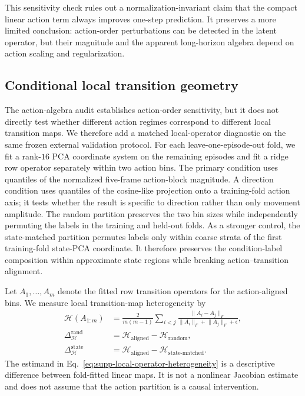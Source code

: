 \documentclass{article}
\begin{document}
This sensitivity check rules out a normalization-invariant claim that the
compact linear action term always improves one-step prediction. It preserves a
more limited conclusion: action-order perturbations can be detected in the
latent operator, but their magnitude and the apparent long-horizon algebra
depend on action scaling and regularization.

\subsection{Conditional local transition geometry}
\label{sec:supp-conditional-operator-geometry}

The action-algebra audit establishes action-order sensitivity, but it does not
directly test whether different action regimes correspond to different local
transition maps. We therefore add a matched local-operator diagnostic on the
same frozen external validation protocol. For each leave-one-episode-out fold,
we fit a rank-$16$ PCA coordinate system on the remaining episodes and fit a
ridge row operator separately within two action bins. The primary condition
uses quantiles of the normalized five-frame action-block magnitude. A
direction condition uses quantiles of the cosine-like projection onto a
training-fold action axis; it tests whether the result is specific to direction
rather than only movement amplitude. The random partition preserves the two
bin sizes while independently permuting the labels in the training and held-out
folds. As a stronger control, the state-matched partition permutes labels only
within coarse strata of the first training-fold state-PCA coordinate. It
therefore preserves the condition-label composition within approximate state
regions while breaking action--transition alignment.

Let $A_1,\ldots,A_m$ denote the fitted row transition operators for the
action-aligned bins. We measure local transition-map heterogeneity by
\begin{equation}
\begin{aligned}
\mathcal{H}(A_{1:m})
&=\frac{2}{m(m-1)}\sum_{i<j}
\frac{\lVert A_i-A_j\rVert_F}
{\lVert A_i\rVert_F+\lVert A_j\rVert_F+\epsilon},\\
\Delta_{\mathcal H}^{\mathrm{rand}}
&=\mathcal{H}_{\mathrm{aligned}}-\mathcal{H}_{\mathrm{random}},\\
\Delta_{\mathcal H}^{\mathrm{state}}
&=\mathcal{H}_{\mathrm{aligned}}-\mathcal{H}_{\mathrm{state\text{-}matched}}.
\end{aligned}
\label{eq:supp-local-operator-heterogeneity}
\end{equation}
The estimand in Eq.~\eqref{eq:supp-local-operator-heterogeneity} is a
descriptive difference between fold-fitted linear maps. It is not a nonlinear
Jacobian estimate and does not assume that the action partition is a causal
intervention.
\end{document}
